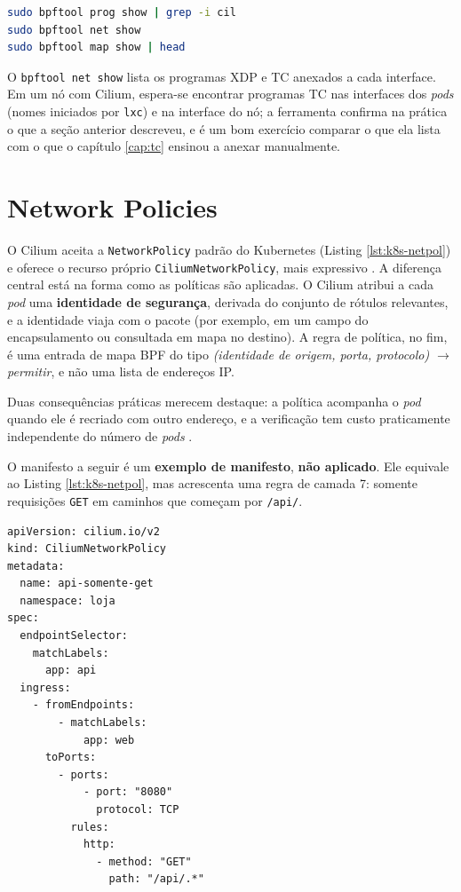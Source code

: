 \begin{lstlisting}[language=bash, caption={Inspeção dos programas do Cilium em um nó com bpftool (requer root em um nó com Cilium).}, label=lst:cilium-bpftool]
sudo bpftool prog show | grep -i cil
sudo bpftool net show
sudo bpftool map show | head
\end{lstlisting}

O \texttt{bpftool net show} lista os programas XDP e TC anexados a cada interface. Em
um nó com Cilium, espera-se encontrar programas TC nas interfaces dos \textit{pods}
(nomes iniciados por \texttt{lxc}) e na interface do nó; a ferramenta confirma na
prática o que a seção anterior descreveu, e é um bom exercício comparar o que ela
lista com o que o capítulo \ref{cap:tc} ensinou a anexar manualmente.

\section{Network Policies}

O Cilium aceita a \texttt{NetworkPolicy} padrão do Kubernetes (Listing
\ref{lst:k8s-netpol}) e oferece o recurso próprio \texttt{CiliumNetworkPolicy}, mais
expressivo \cite{ciliumdocs}. A diferença central está na forma como as políticas são
aplicadas. O Cilium atribui a cada \textit{pod} uma \textbf{identidade de segurança},
derivada do conjunto de rótulos relevantes, e a identidade viaja com o pacote
(por exemplo, em um campo do encapsulamento ou consultada em mapa no destino). A regra
de política, no fim, é uma entrada de mapa BPF do tipo \textit{(identidade de origem,
porta, protocolo) $\rightarrow$ permitir}, e não uma lista de endereços IP.

Duas consequências práticas merecem destaque: a política acompanha o \textit{pod} quando
ele é recriado com outro endereço, e a verificação tem custo praticamente
independente do número de \textit{pods} \cite{ciliumdocs}.

O manifesto a seguir é um \textbf{exemplo de manifesto}, \textbf{não aplicado}. Ele
equivale ao Listing \ref{lst:k8s-netpol}, mas acrescenta uma regra de camada 7:
somente requisições \texttt{GET} em caminhos que começam por \texttt{/api/}.

\begin{lstlisting}[caption={CiliumNetworkPolicy com regra HTTP na camada 7 (exemplo de manifesto).}, label=lst:cilium-cnp]
apiVersion: cilium.io/v2
kind: CiliumNetworkPolicy
metadata:
  name: api-somente-get
  namespace: loja
spec:
  endpointSelector:
    matchLabels:
      app: api
  ingress:
    - fromEndpoints:
        - matchLabels:
            app: web
      toPorts:
        - ports:
            - port: "8080"
              protocol: TCP
          rules:
            http:
              - method: "GET"
                path: "/api/.*"
\end{lstlisting}

